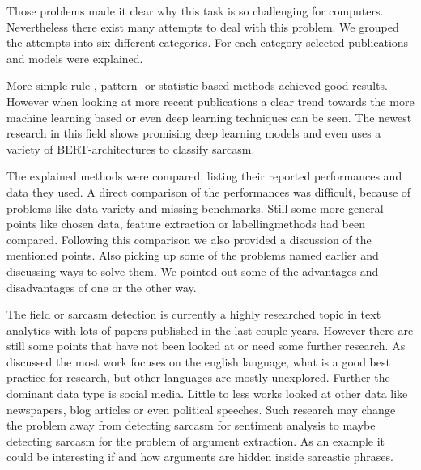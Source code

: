 \documentclass[sigconf,  review=false, nonacm=true]{acmart}
\begin{document}
Those problems made it clear why this task is so challenging for computers. Nevertheless there exist many attempts to deal with this problem. We grouped the attempts into six different categories. For each category selected publications and models were explained.

More simple rule-, pattern- or statistic-based methods achieved good results. However when looking at more recent publications a clear trend towards the more machine learning based or even deep learning techniques can be seen. The newest research in this field shows promising deep learning models and even uses a variety of BERT-architectures to classify sarcasm. 

The explained methods were compared, listing their reported performances and data they used. A direct comparison of the performances was difficult, because of problems like data variety and missing benchmarks. Still some more general points like chosen data, feature extraction or labellingmethods had been compared. Following this comparison we also provided a discussion of the mentioned points. Also picking up some of the problems named earlier and discussing ways to solve them. We pointed out some of the advantages and disadvantages of one or the other way.

The field or sarcasm detection is currently a highly researched topic in text analytics with lots of papers published in the last couple years. However there are still some points that have not been looked at or need some further research. As discussed the most work focuses on the english language, what is a good best practice for research, but other languages are mostly unexplored. Further the dominant data type is social media. Little to less works looked at other data like newspapers, blog articles or even political speeches. Such research may change the problem away from detecting sarcasm for sentiment analysis to maybe detecting sarcasm for the problem of argument extraction. As an example it could be interesting if and how arguments are hidden inside sarcastic phrases. 





\appendix
\end{document}
